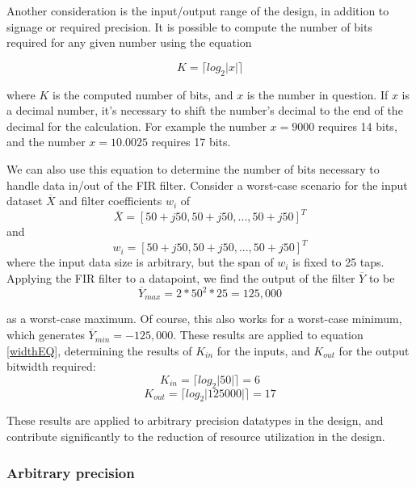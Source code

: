 \documentclass[../report_polarFIR.tex]{subfiles}
\begin{document}
Another consideration is the input/output range of the design, in addition to signage or required precision. It is possible to compute the number of bits required for any given number using the equation

\begin{equation}\label{widthEQ}
	K = \lceil log_2{|x|} \rceil
\end{equation}

where $K$ is the computed number of bits, and $x$ is the number in question. If $x$ is a decimal number, it's necessary to shift the number's decimal to the end of the decimal for the calculation. For example the number $x = 9000$ requires 14 bits, and the number $x = 10.0025$ requires 17 bits.

We can also use this equation to determine the number of bits necessary to handle data in/out of the FIR filter. Consider a worst-case scenario for the input dataset $\overline X$ and filter coefficients $w_i$ of
\begin{equation*}
	\overline X = [50 + j50, 50 + j50,...,50+j50]^T
\end{equation*}
and
\begin{equation*}
	w_i = [50 + j50, 50 + j50,...,50+j50]^T
\end{equation*}
where the input data size is arbitrary, but the span of $w_i$ is fixed to 25 taps. Applying the FIR filter to a datapoint, we find the output of the filter $\overline Y$ to be
\begin{equation*}
	\overline Y_{max} = 2 * 50^2 * 25 = 125,000 
\end{equation*}

as a worst-case maximum. Of course, this also works for a worst-case minimum, which generates  $\overline Y_{min} = -125,000$. These results are applied to equation \ref{widthEQ}, determining the results of $K_{in}$ for the inputs, and $K_{out}$ for the output bitwidth required:
\begin{equation}
	K_{in} = \lceil log_{2}{|50|} \rceil = 6
\end{equation}
\begin{equation}
	K_{out} = \lceil log_{2}{|125000|} \rceil = 17
\end{equation}

These results are applied to arbitrary precision datatypes in the design, and contribute significantly to the reduction of resource utilization in the design.

\subsubsection{Arbitrary precision}
\end{document}
